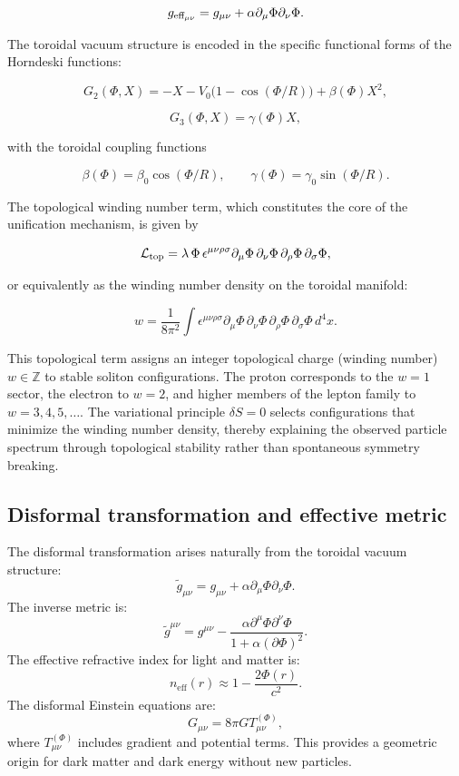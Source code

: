 \documentclass[11pt,a4paper]{article}
\begin{document}
\[
g_{\rm eff_{\mu\nu}} = g_{\mu\nu} + \alpha \partial_\mu \Phi \partial_\nu \Phi.
\]

The toroidal vacuum structure is encoded in the specific functional forms of the Horndeski functions:

\[
G_2(\Phi, X) = -X - V_0 \big(1 - \cos(\Phi / R)\big) + \beta(\Phi) X^2,
\]

\[
G_3(\Phi, X) = \gamma(\Phi) X,
\]

with the toroidal coupling functions

\[
\beta(\Phi) = \beta_0 \cos(\Phi / R), \qquad \gamma(\Phi) = \gamma_0 \sin(\Phi / R).
\]

The topological winding number term, which constitutes the core of the unification mechanism, is given by

\[
\mathcal{L}_{\rm top} = \lambda \, \Phi \, \epsilon^{\mu\nu\rho\sigma} \partial_\mu \Phi \, \partial_\nu \Phi \, \partial_\rho \Phi \, \partial_\sigma \Phi,
\]

or equivalently as the winding number density on the toroidal manifold:

\[
w = \frac{1}{8\pi^2} \int \epsilon^{\mu\nu\rho\sigma} \partial_\mu \Phi \, \partial_\nu \Phi \, \partial_\rho \Phi \, \partial_\sigma \Phi \, d^4x.
\]

This topological term assigns an integer topological charge (winding number) \( w \in \mathbb{Z} \) to stable soliton configurations. The proton corresponds to the \( w = 1 \) sector, the electron to \( w = 2 \), and higher members of the lepton family to \( w = 3,4,5,\dots \). The variational principle \(\delta S = 0\) selects configurations that minimize the winding number density, thereby explaining the observed particle spectrum through topological stability rather than spontaneous symmetry breaking.

\subsection{Disformal transformation and effective metric}
\label{subsec:disformal}
The disformal transformation arises naturally from the toroidal vacuum structure:
\[
\tilde{g}_{\mu\nu} = g_{\mu\nu} + \alpha \partial_\mu \Phi \partial_\nu \Phi. \tag{5}
\]
The inverse metric is:
\[
\tilde{g}^{\mu\nu} = g^{\mu\nu} - \frac{\alpha \partial^\mu \Phi \partial^\nu \Phi}{1 + \alpha (\partial \Phi)^2}. \tag{6}
\]
The effective refractive index for light and matter is:
\[
n_{\mathrm{eff}}(r) \approx 1 - \frac{2\Phi(r)}{c^2}. \tag{7}
\]
The disformal Einstein equations are:
\[
G_{\mu\nu} = 8\pi G T_{\mu\nu}^{(\Phi)}, \tag{8}
\]
where \(T_{\mu\nu}^{(\Phi)}\) includes gradient and potential terms. This provides a geometric origin for dark matter and dark energy without new particles.
\end{document}
